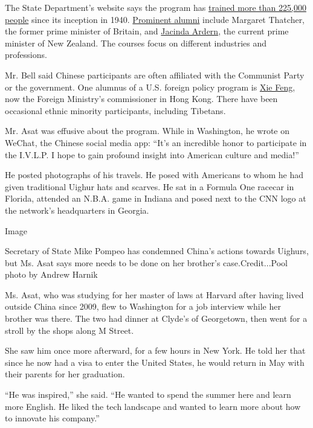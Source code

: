 The State Department's website says the program has
\href{https://eca.state.gov/highlight/launching-80th-anniversary-international-visitor-leadership-program}{trained
more than 225,000 people} since its inception in 1940.
\href{https://eca.state.gov/facesofexchange/}{Prominent alumni} include
Margaret Thatcher, the former prime minister of Britain, and
\href{https://www.nytimes.com/2019/03/22/world/australia/jacinda-ardern-new-zealand-leader.html}{Jacinda
Ardern}, the current prime minister of New Zealand. The courses focus on
different industries and professions.

Mr. Bell said Chinese participants are often affiliated with the
Communist Party or the government. One alumnus of a U.S. foreign policy
program is
\href{https://www.nytimes.com/2020/02/28/opinion/coronavirus-china-government.html}{Xie
Feng}, now the Foreign Ministry's commissioner in Hong Kong. There have
been occasional ethnic minority participants, including Tibetans.

Mr. Asat was effusive about the program. While in Washington, he wrote
on WeChat, the Chinese social media app: ``It's an incredible honor to
participate in the I.V.L.P. I hope to gain profound insight into
American culture and media!''

He posted photographs of his travels. He posed with Americans to whom he
had given traditional Uighur hats and scarves. He sat in a Formula One
racecar in Florida, attended an N.B.A. game in Indiana and posed next to
the CNN logo at the network's headquarters in Georgia.

Image

Secretary of State Mike Pompeo has condemned China's actions towards
Uighurs, but Ms. Asat says more needs to be done on her brother's
case.Credit...Pool photo by Andrew Harnik

Ms. Asat, who was studying for her master of laws at Harvard after
having lived outside China since 2009, flew to Washington for a job
interview while her brother was there. The two had dinner at Clyde's of
Georgetown, then went for a stroll by the shops along M Street.

She saw him once more afterward, for a few hours in New York. He told
her that since he now had a visa to enter the United States, he would
return in May with their parents for her graduation.

``He was inspired,'' she said. ``He wanted to spend the summer here and
learn more English. He liked the tech landscape and wanted to learn more
about how to innovate his company.''

